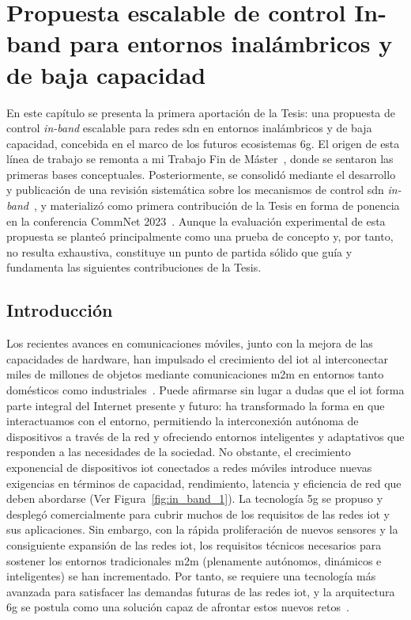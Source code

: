 \chapter{Propuesta escalable de control In-band para entornos inalámbricos y de baja capacidad}
\label{ch:propuestaInband}

En este capítulo se presenta la primera aportación de la Tesis: una propuesta de control \textit{in-band} escalable para redes \gls{sdn} en entornos inalámbricos y de baja capacidad, concebida en el marco de los futuros ecosistemas \gls{6g}. El origen de esta línea de trabajo se remonta a mi Trabajo Fin de Máster~\cite{carrascal2023diseno}, donde se sentaron las primeras bases conceptuales. Posteriormente, se consolidó mediante el desarrollo y publicación de una revisión sistemática sobre los mecanismos de control \gls{sdn} \textit{in-band}~\cite{carrascal2023comprehensive}, y materializó como primera contribución de la Tesis en forma de ponencia en la conferencia CommNet 2023~\cite{carrascal2023scalable}. Aunque la evaluación experimental de esta propuesta se planteó principalmente como una prueba de concepto y, por tanto, no resulta exhaustiva, constituye un punto de partida sólido que guía y fundamenta las siguientes contribuciones de la Tesis.

\section{Introducción}

Los recientes avances en comunicaciones móviles, junto con la mejora de las capacidades de hardware, han impulsado el crecimiento del \gls{iot} al interconectar miles de millones de objetos mediante comunicaciones \gls{m2m} en entornos tanto domésticos como industriales~\cite{Balaji2019}. Puede afirmarse sin lugar a dudas que el \gls{iot} forma parte integral del Internet presente y futuro: ha transformado la forma en que interactuamos con el entorno, permitiendo la interconexión autónoma de dispositivos a través de la red y ofreciendo entornos inteligentes y adaptativos que responden a las necesidades de la sociedad. No obstante, el crecimiento exponencial de dispositivos \gls{iot} conectados a redes móviles introduce nuevas exigencias en términos de capacidad, rendimiento, latencia y eficiencia de red que deben abordarse (Ver Figura~\ref{fig:in_band_1}). La tecnología \gls{5g} se propuso y desplegó comercialmente para cubrir muchos de los requisitos de las redes \gls{iot} y sus aplicaciones. Sin embargo, con la rápida proliferación de nuevos sensores y la consiguiente expansión de las redes \gls{iot}, los requisitos técnicos necesarios para sostener los entornos tradicionales \gls{m2m} (plenamente autónomos, dinámicos e inteligentes) se han incrementado. Por tanto, se requiere una tecnología más avanzada para satisfacer las demandas futuras de las redes \gls{iot}, y la arquitectura \gls{6g} se postula como una solución capaz de afrontar estos nuevos retos~\cite{Nguyen2022}.

